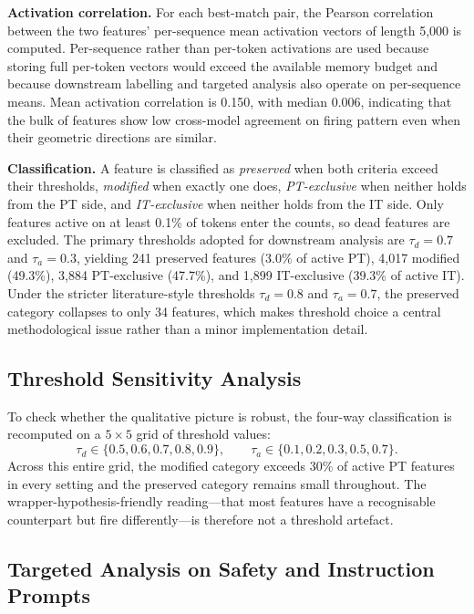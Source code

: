 \textbf{Activation correlation.} For each best-match pair, the Pearson correlation between the two features' per-sequence mean activation vectors of length 5,000 is computed. Per-sequence rather than per-token activations are used because storing full per-token vectors would exceed the available memory budget and because downstream labelling and targeted analysis also operate on per-sequence means. Mean activation correlation is 0.150, with median 0.006, indicating that the bulk of features show low cross-model agreement on firing pattern even when their geometric directions are similar.

\textbf{Classification.} A feature is classified as \textit{preserved} when both criteria exceed their thresholds, \textit{modified} when exactly one does, \textit{PT-exclusive} when neither holds from the PT side, and \textit{IT-exclusive} when neither holds from the IT side. Only features active on at least 0.1\% of tokens enter the counts, so dead features are excluded. The primary thresholds adopted for downstream analysis are $\tau_d = 0.7$ and $\tau_a = 0.3$, yielding 241 preserved features (3.0\% of active PT), 4,017 modified (49.3\%), 3,884 PT-exclusive (47.7\%), and 1,899 IT-exclusive (39.3\% of active IT). Under the stricter literature-style thresholds $\tau_d = 0.8$ and $\tau_a = 0.7$, the preserved category collapses to only 34 features, which makes threshold choice a central methodological issue rather than a minor implementation detail.

\subsection{Threshold Sensitivity Analysis}
\label{subsec:threshold-sensitivity}

To check whether the qualitative picture is robust, the four-way classification is recomputed on a $5 \times 5$ grid of threshold values:
\[
    \tau_d \in \{0.5, 0.6, 0.7, 0.8, 0.9\}, \qquad
    \tau_a \in \{0.1, 0.2, 0.3, 0.5, 0.7\}.
\]
Across this entire grid, the modified category exceeds 30\% of active PT features in every setting and the preserved category remains small throughout. The wrapper-hypothesis-friendly reading---that most features have a recognisable counterpart but fire differently---is therefore not a threshold artefact.

\subsection{Targeted Analysis on Safety and Instruction Prompts}
\label{subsec:targeted-analysis}

